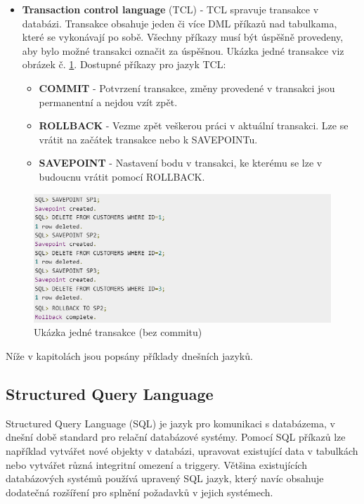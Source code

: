 \begin{itemize}
\item \textbf{Transaction control language} (TCL) - TCL spravuje transakce v databázi. Transakce obsahuje jeden či více DML příkazů nad tabulkama, které se vykonávají po sobě. Všechny příkazy musí být úspěšně provedeny, aby bylo možné transakci označit za úspěšnou. Ukázka jedné transakce viz obrázek č. \ref{fig:tcl_savepoint}. Dostupné příkazy pro jazyk TCL:
	\begin{itemize}
	\item \textbf{COMMIT} - Potvrzení transakce, změny provedené v transakci jsou permanentní a nejdou vzít zpět.
	\item \textbf{ROLLBACK} - Vezme zpět veškerou práci v aktuální transakci. Lze se vrátit na začátek transakce nebo k SAVEPOINTu.
	\item \textbf{SAVEPOINT} - Nastavení bodu v transakci, ke kterému se lze v budoucnu vrátit pomocí ROLLBACK.
	\end{itemize}
\end{itemize}
	\begin{figure}[H]
	\centering
	\includegraphics[width=14cm]{img/databaze/tcl_savepoint}
	\caption{Ukázka jedné transakce (bez commitu)}
	\label{fig:tcl_savepoint}
	\end{figure}

\noindent Níže v kapitolách jsou popsány příklady dnešních jazyků.
\subsection{Structured Query Language}
Structured Query Language (\gls{SQL}) je jazyk pro komunikaci s databázema, v dnešní době standard pro relační databázové systémy. Pomocí \gls{SQL} příkazů lze například vytvářet nové objekty v databázi, upravovat existující data v tabulkách nebo vytvářet různá integritní omezení a triggery. Většina existujících databázových systémů používá upravený \gls{SQL} jazyk, který navíc obsahuje dodatečná rozšíření pro splnění požadavků v jejich systémech.

